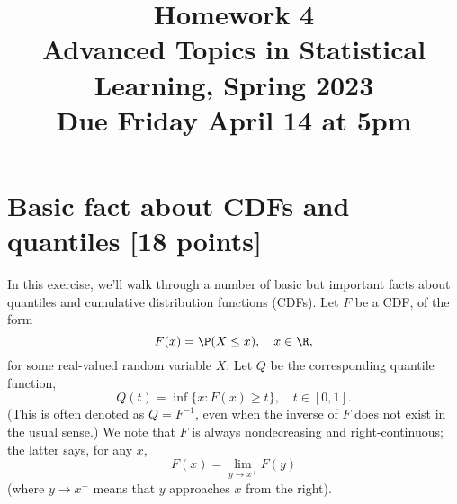 \documentclass{article}
\title{Homework 4 \\ \smallskip
\large Advanced Topics in Statistical Learning, Spring 2023 \\ \smallskip
Due Friday April 14 at 5pm}
\date{}
\begin{document}
\maketitle
\RaggedRight
\vspace{-50pt}

\section{Basic fact about CDFs and quantiles [18 points]}

In this exercise, we'll walk through a number of basic but important facts about 
quantiles and cumulative distribution functions (CDFs). Let $F$ be a CDF, of the
form 
\[
F(x) = \P(X \leq x), \quad x \in \R,
\]
for some real-valued random variable $X$. Let $Q$ be the corresponding quantile 
function,
\[
Q(t) = \inf \{ x : F(x) \geq t \}, \quad t \in [0,1].
\]
(This is often denoted as $Q = F^{-1}$, even when the inverse of $F$ does not
exist in the usual sense.) We note that $F$ is always nondecreasing and 
right-continuous; the latter says, for any $x$,    
\[
F(x) = \lim_{y \to x^+} F(y)
\]
(where $y \to x^+$ means that $y$ approaches $x$ from the right).
\end{document}
